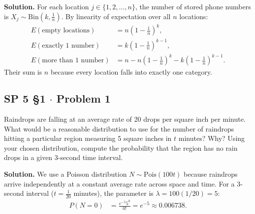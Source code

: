 \documentclass[11pt,a4paper]{article}
\begin{document}
\noindent \textbf{Solution.} For each location $j \in \{1, 2, \dots, n\}$, the number of stored phone numbers is $X_j \sim \text{Bin}\left(k, \frac{1}{n}\right)$. By linearity of expectation over all $n$ locations:
\begin{align*}
E(\text{empty locations}) &= n \left(1 - \frac{1}{n}\right)^k, \\
E(\text{exactly 1 number}) &= k \left(1 - \frac{1}{n}\right)^{k-1}, \\
E(\text{more than 1 number}) &= n - n\left(1 - \frac{1}{n}\right)^k - k\left(1 - \frac{1}{n}\right)^{k-1}.
\end{align*}
Their sum is $n$ because every location falls into exactly one category.

\vspace{10pt}
\subsection{SP 5 \S1 $\cdot$ Problem 1}
\begin{tcolorbox}[title={SP 5 \S1 $\cdot$ Problem 1}]
Raindrops are falling at an average rate of 20 drops per square inch per minute. What would be a reasonable distribution to use for the number of raindrops hitting a particular region measuring 5 square inches in $t$ minutes? Why? Using your chosen distribution, compute the probability that the region has no rain drops in a given 3-second time interval.
\end{tcolorbox}

\noindent \textbf{Solution.} We use a Poisson distribution $N \sim \text{Pois}(100t)$ because raindrops arrive independently at a constant average rate across space and time. For a 3-second interval ($t = \frac{1}{20}$ minutes), the parameter is $\lambda = 100(1/20) = 5$:
\begin{align*}
P(N = 0) &= \frac{e^{-5} 5^0}{0!} = e^{-5} \approx 0.006738.
\end{align*}

\vspace{10pt}
\end{document}

